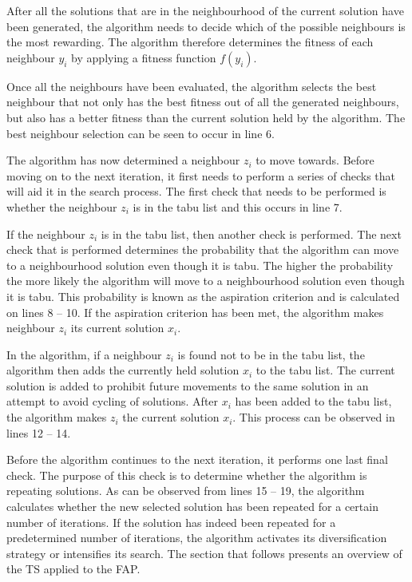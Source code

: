 After all the solutions that are in the neighbourhood of the current solution have been generated, the algorithm needs to decide which of the possible neighbours is the most rewarding. The algorithm therefore determines the fitness of each neighbour $y_i$ by applying a fitness function $f(y_i)$. 

Once all the neighbours have been evaluated, the algorithm selects the best neighbour that not only has the best fitness out of all the generated neighbours, but also has a better fitness than the current solution held by the algorithm. The best neighbour selection can be seen to occur in line 6.

The algorithm has now determined a neighbour $z_i$ to move towards. Before moving on to the next iteration, it first needs to perform a series of checks that will aid it in the search process. The first check that needs to be performed is whether the neighbour $z_i$ is in the tabu list and this occurs in line 7. 

If the neighbour $z_i$ is in the tabu list, then another check is performed. The next check that is performed determines the probability that the algorithm can move to a neighbourhood solution even though it is tabu. The higher the probability the more likely the algorithm will move to a neighbourhood solution even though it is tabu. This probability is known as the aspiration criterion and is calculated on lines 8 -- 10. If the aspiration criterion has been met, the algorithm makes neighbour $z_i$ its current solution $x_i$.

In the algorithm, if a neighbour $z_i$ is found not to be in the tabu list, the algorithm then adds the currently held solution $x_i$ to the tabu list. The current solution is added to prohibit future movements to the same solution in an attempt to avoid cycling of solutions. After $x_i$ has been added to the tabu list, the algorithm makes $z_i$ the current solution $x_i$. This process can be observed in lines 12 -- 14.

Before the algorithm continues to the next iteration, it performs one last final check. The purpose of this check is to determine whether the algorithm is repeating solutions. As can be observed from lines 15 -- 19, the algorithm calculates whether the new selected solution has been repeated for a certain number of iterations. If the solution has indeed been repeated for a predetermined number of iterations, the algorithm activates its diversification strategy or intensifies its search.
The section that follows presents an overview of the \gls{TS} applied to the \gls{FAP}.
